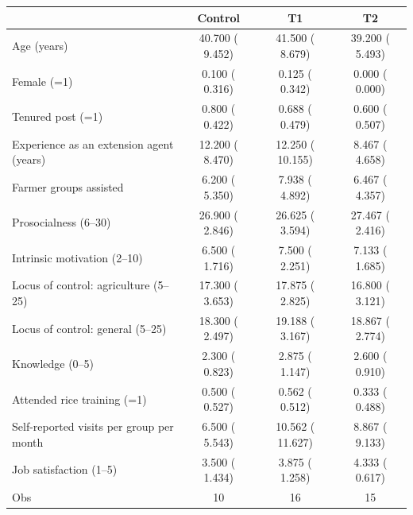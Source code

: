 \def\sym#1{\ifmmode^{#1}\else\(^{#1}\)\fi}
\begin{tabular}{lccc}
\toprule
 & Control & T1 & T2 \\
\midrule
Age (years) & 40.700 (    9.452) & 41.500 (    8.679) & 39.200 (    5.493) \\
Female (=1) & 0.100 (    0.316) & 0.125 (    0.342) & 0.000 (    0.000) \\
Tenured post (=1) & 0.800 (    0.422) & 0.688 (    0.479) & 0.600 (    0.507) \\
Experience as an extension agent (years) & 12.200 (    8.470) & 12.250 (   10.155) & 8.467 (    4.658) \\
Farmer groups assisted & 6.200 (    5.350) & 7.938 (    4.892) & 6.467 (    4.357) \\
Prosocialness (6--30) & 26.900 (    2.846) & 26.625 (    3.594) & 27.467 (    2.416) \\
Intrinsic motivation (2--10) & 6.500 (    1.716) & 7.500 (    2.251) & 7.133 (    1.685) \\
Locus of control: agriculture (5--25) & 17.300 (    3.653) & 17.875 (    2.825) & 16.800 (    3.121) \\
Locus of control: general (5--25) & 18.300 (    2.497) & 19.188 (    3.167) & 18.867 (    2.774) \\
Knowledge (0--5) & 2.300 (    0.823) & 2.875 (    1.147) & 2.600 (    0.910) \\
Attended rice training (=1) & 0.500 (    0.527) & 0.562 (    0.512) & 0.333 (    0.488) \\
Self-reported visits per group per month & 6.500 (    5.543) & 10.562 (   11.627) & 8.867 (    9.133) \\
Job satisfaction (1--5) & 3.500 (    1.434) & 3.875 (    1.258) & 4.333 (    0.617) \\
\midrule
Obs & 10 & 16 & 15 \\
\bottomrule
\end{tabular}
